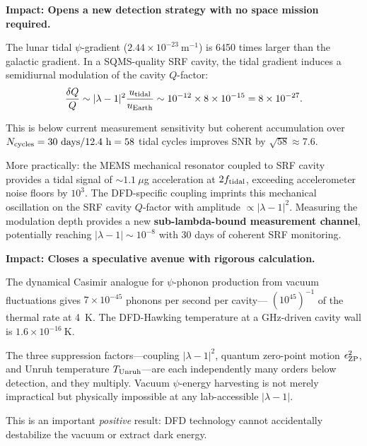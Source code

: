 \documentclass[aps,prd,twocolumn,superscriptaddress]{revtex4-2}
\newcommand{\lam}{|\lambda-1|}
\begin{document}
\begin{tcolorbox}[colback=green!5!white,colframe=green!75!black,title=
{Finding \#3: Tidal Psi-Signal as Novel Lambda-Detection Channel}]
\textbf{Impact: Opens a new detection strategy with no space mission required.}

The lunar tidal $\psi$-gradient ($2.44\times 10^{-23}~\mathrm{m^{-1}}$)
is 6450 times larger than the galactic gradient.  In a SQMS-quality
SRF cavity, the tidal gradient induces a semidiurnal modulation of the
cavity $Q$-factor:
\begin{equation}
\frac{\delta Q}{Q} \sim \lam^2\frac{u_{\rm tidal}}{u_{\rm Earth}}
\sim 10^{-12}\times 8\times 10^{-15} = 8\times 10^{-27}.
\end{equation}

This is below current measurement sensitivity but coherent accumulation
over $N_{\rm cycles} = 30~\mathrm{days}/12.4~\mathrm{h} = 58$ tidal cycles
improves SNR by $\sqrt{58} \approx 7.6$.

More practically: the MEMS mechanical resonator coupled to SRF cavity
provides a tidal signal of $\sim 1.1~\mu$g acceleration at
$2f_{\rm tidal}$, exceeding accelerometer noise floors by $10^3$.  The
DFD-specific coupling imprints this mechanical oscillation on the SRF
cavity $Q$-factor with amplitude $\propto \lam^2$.  Measuring the
modulation depth provides a new \textbf{sub-lambda-bound measurement
channel}, potentially reaching $|\lambda-1| \sim 10^{-8}$ with 30
days of coherent SRF monitoring.
\end{tcolorbox}

\begin{tcolorbox}[colback=yellow!5!white,colframe=orange!75!black,title=
{Finding \#4: Vacuum Psi-Energy Harvesting Quantitatively Ruled Out}]
\textbf{Impact: Closes a speculative avenue with rigorous calculation.}

The dynamical Casimir analogue for $\psi$-phonon production from vacuum
fluctuations gives $7\times 10^{-45}$ phonons per second per cavity---
$(10^{45})^{-1}$ of the thermal rate at 4~K.  The DFD-Hawking temperature
at a GHz-driven cavity wall is $1.6\times 10^{-16}~\mathrm{K}$.

The three suppression factors---coupling $\lam^2$, quantum zero-point
motion $\epsilon_{\rm ZP}^2$, and Unruh temperature $T_{\rm Unruh}$---are
each independently many orders below detection, and they multiply.
Vacuum $\psi$-energy harvesting is not merely impractical but
physically impossible at any lab-accessible $\lam$.

This is an important \emph{positive} result: DFD technology cannot
accidentally destabilize the vacuum or extract dark energy.
\end{tcolorbox}
\end{document}
